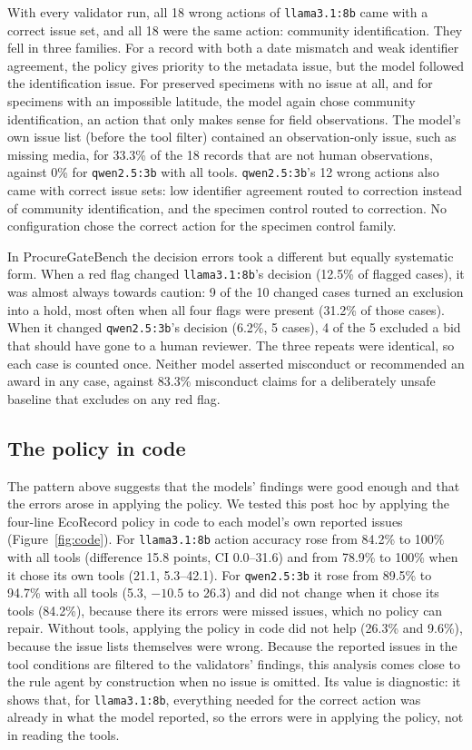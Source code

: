 \documentclass[11pt,a4paper]{article}
\newcommand{\code}[1]{\texttt{#1}}
\begin{document}
With every validator run, all 18 wrong actions of \code{llama3.1:8b} came with a correct issue set, and all 18
were the same action: community identification. They fell in three families. For a record with both a date
mismatch and weak identifier agreement, the policy gives priority to the metadata issue, but the model followed
the identification issue. For preserved specimens with no issue at all, and for specimens with an impossible
latitude, the model again chose community identification, an action that only makes sense for field
observations. The model's own issue list (before the tool filter) contained an observation-only issue, such as
missing media, for 33.3\% of the 18 records that are not human observations, against 0\% for \code{qwen2.5:3b}
with all tools. \code{qwen2.5:3b}'s 12 wrong actions also came with correct issue sets: low identifier agreement
routed to correction instead of community identification, and the specimen control routed to correction. No
configuration chose the correct action for the specimen control family.

In ProcureGateBench the decision errors took a different but equally systematic form. When a red flag changed
\code{llama3.1:8b}'s decision (12.5\% of flagged cases), it was almost always towards caution: 9 of the 10 changed cases
turned an exclusion into a hold, most often when all four flags were present (31.2\% of those cases). When it
changed \code{qwen2.5:3b}'s decision (6.2\%, 5 cases), 4 of the 5 excluded a bid that should have gone to a human
reviewer. The three repeats were identical, so each case is counted once. Neither model asserted misconduct or recommended an award in any case, against 83.3\% misconduct
claims for a deliberately unsafe baseline that excludes on any red flag.

\subsection{The policy in code}

The pattern above suggests that the models' findings were good enough and that the errors arose in applying the
policy. We tested this post hoc by applying the four-line EcoRecord policy in code to each model's own reported
issues (Figure~\ref{fig:code}). For \code{llama3.1:8b} action accuracy rose from 84.2\% to 100\% with all tools
(difference 15.8 points, CI 0.0--31.6) and from 78.9\% to 100\% when it chose its own tools (21.1, 5.3--42.1).
For \code{qwen2.5:3b} it rose from 89.5\% to 94.7\% with all tools (5.3, $-10.5$ to 26.3) and did not change when
it chose its tools (84.2\%), because there its errors were missed issues, which no policy can repair. Without
tools, applying the policy in code did not help (26.3\% and 9.6\%), because the issue lists themselves were wrong.
Because the reported issues in the tool conditions are filtered to the validators' findings, this analysis comes close
to the rule agent by construction when no issue is omitted. Its value is diagnostic: it shows that, for
\code{llama3.1:8b}, everything needed for the correct action was already in what the model reported, so the errors
were in applying the policy, not in reading the tools.
\end{document}
